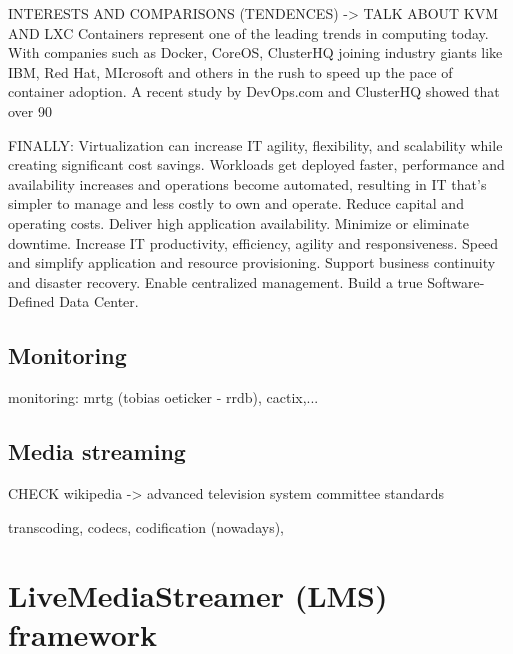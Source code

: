 INTERESTS AND COMPARISONS (TENDENCES) -> TALK ABOUT KVM AND LXC
Containers represent one of the leading trends in computing today. With companies such as Docker, CoreOS, ClusterHQ joining industry giants like IBM, Red Hat, MIcrosoft and others in the rush to speed up the pace of container adoption. A recent study by DevOps.com and ClusterHQ showed that over 90%



FINALLY:
Virtualization can increase IT agility, flexibility, and scalability while creating significant cost savings. Workloads get deployed faster, performance and availability increases and operations become automated, resulting in IT that's simpler to manage and less costly to own and operate.
Reduce capital and operating costs.
Deliver high application availability.
Minimize or eliminate downtime.
Increase IT productivity, efficiency, agility and responsiveness.
Speed and simplify application and resource provisioning.
Support business continuity and disaster recovery.
Enable centralized management.
Build a true Software-Defined Data Center.




\subsection{Monitoring}

monitoring: mrtg (tobias oeticker - rrdb), cactix,...

\subsection{Media streaming}

CHECK wikipedia -> advanced television system committee standards

transcoding, codecs, codification (nowadays), 

\section{LiveMediaStreamer (LMS) framework}







